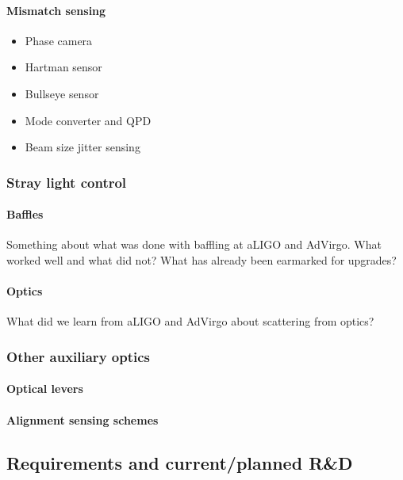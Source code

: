 \paragraph{Mismatch sensing}
\begin{itemize}
\item Phase camera
\item Hartman sensor
\item Bullseye sensor
\item Mode converter and QPD
\item Beam size jitter sensing
\end{itemize}
\subsubsection{Stray light control}
\paragraph{Baffles}
Something about what was done with baffling at aLIGO and AdVirgo. What worked well and what did not? What has already been earmarked for upgrades?

\paragraph{Optics}
What did we learn from aLIGO and AdVirgo about scattering from optics?

\subsubsection{Other auxiliary optics}

\paragraph{Optical levers}
\paragraph{Alignment sensing schemes}

\subsection{Requirements and current/planned R\&D}
